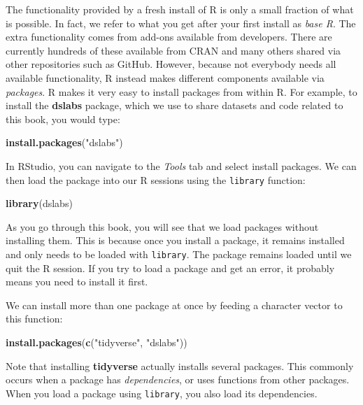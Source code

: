 \documentclass[
]{krantz}
\newenvironment{Shaded}{\begin{snugshade}}{\end{snugshade}}
\newcommand{\KeywordTok}[1]{\textcolor[rgb]{0.27,0.27,0.27}{\textbf{#1}}}
\newcommand{\NormalTok}[1]{#1}
\newcommand{\StringTok}[1]{\textcolor[rgb]{0.5,0.5,0.5}{#1}}
\begin{document}
The functionality provided by a fresh install of R is only a small fraction of what is possible. In fact, we refer to what you get after your first install as \emph{base R}. The extra functionality comes from add-ons available from developers. There are currently hundreds of these available from CRAN and many others shared via other repositories such as GitHub. However, because not everybody needs all available functionality, R instead makes different components available via \emph{packages}. R makes it very easy to install packages from within R. For example, to install the \textbf{dslabs} package, which we use to share datasets and code related to this book, you would type:

\begin{Shaded}
\begin{Highlighting}[]
\KeywordTok{install.packages}\NormalTok{(}\StringTok{"dslabs"}\NormalTok{)}
\end{Highlighting}
\end{Shaded}

In RStudio, you can navigate to the \emph{Tools} tab and select install packages. We can then load the package into our R sessions using the \texttt{library} function:

\begin{Shaded}
\begin{Highlighting}[]
\KeywordTok{library}\NormalTok{(dslabs)}
\end{Highlighting}
\end{Shaded}

As you go through this book, you will see that we load packages without installing them. This is because once you install a package, it remains installed and only needs to be loaded with \texttt{library}. The package remains loaded until we quit the R session. If you try to load a package and get an error, it probably means you need to
install it first.

We can install more than one package at once by feeding a character vector to this function:

\begin{Shaded}
\begin{Highlighting}[]
\KeywordTok{install.packages}\NormalTok{(}\KeywordTok{c}\NormalTok{(}\StringTok{"tidyverse"}\NormalTok{, }\StringTok{"dslabs"}\NormalTok{))}
\end{Highlighting}
\end{Shaded}

Note that installing \textbf{tidyverse} actually installs several packages. This commonly occurs when a package has \emph{dependencies}, or uses functions from other packages. When you load a package using \texttt{library}, you also load its dependencies.
\end{document}
